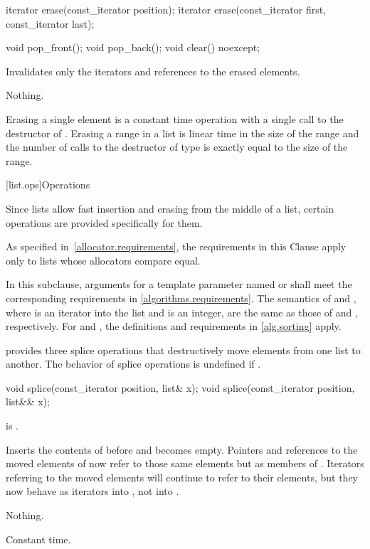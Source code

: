 %
\begin{itemdecl}
iterator erase(const_iterator position);
iterator erase(const_iterator first, const_iterator last);

void pop_front();
void pop_back();
void clear() noexcept;
\end{itemdecl}

\begin{itemdescr}
\pnum
\effects
Invalidates only the iterators and references to the erased elements.

\pnum
\throws
Nothing.

\pnum
\complexity
Erasing a single element is a constant time operation with a single call to the destructor of
.
Erasing a range in a list is linear time in the
size of the range and the number of calls to the destructor of type
is exactly equal to the size of the range.
\end{itemdescr}

[list.ops]{Operations}

\pnum
Since lists allow fast insertion and erasing from the middle of a list, certain
operations are provided specifically for them.
\begin{footnote}
As specified
in~\ref{allocator.requirements}, the requirements in this Clause apply only to
lists whose allocators compare equal.
\end{footnote}
In this subclause,
arguments for a template parameter
named  or 
shall meet the corresponding requirements in \ref{algorithms.requirements}.
The semantics of  and ,
where  is an iterator into the list and  is an integer,
are the same as those of  and ,
respectively.
For  and ,
the definitions and requirements in \ref{alg.sorting} apply.

\pnum
{} provides three splice operations that destructively move elements from one list to
another. The behavior of splice operations is undefined if .

%
\begin{itemdecl}
void splice(const_iterator position, list& x);
void splice(const_iterator position, list&& x);
\end{itemdecl}

\begin{itemdescr}
\pnum
\expects
{} is .

\pnum
\effects
Inserts the contents of
before
and
becomes empty.
Pointers and references to the moved elements of
now refer to those same elements but as members of
.
Iterators referring to the moved elements will continue to refer to their
elements, but they now behave as iterators into
,
not into
.

\pnum
\throws
Nothing.

\pnum
\complexity
Constant time.
\end{itemdescr}

